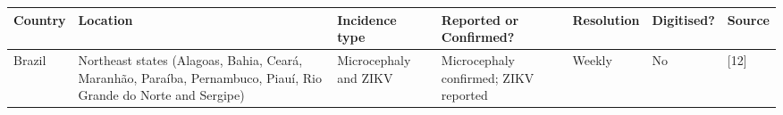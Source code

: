 \documentclass[10pt,letterpaper]{article}
\begin{document}
\begin{longtable}[]{@{}lllllll@{}}
\toprule
\begin{minipage}[b]{0.03\columnwidth}\raggedright\strut
Country\strut
\end{minipage} & \begin{minipage}[b]{0.37\columnwidth}\raggedright\strut
Location\strut
\end{minipage} & \begin{minipage}[b]{0.08\columnwidth}\raggedright\strut
Incidence type\strut
\end{minipage} & \begin{minipage}[b]{0.17\columnwidth}\raggedright\strut
Reported or Confirmed?\strut
\end{minipage} & \begin{minipage}[b]{0.04\columnwidth}\raggedright\strut
Resolution\strut
\end{minipage} & \begin{minipage}[b]{0.04\columnwidth}\raggedright\strut
Digitised?\strut
\end{minipage} & \begin{minipage}[b]{0.08\columnwidth}\raggedright\strut
Source\strut
\end{minipage}\tabularnewline
\midrule
\endhead
\begin{minipage}[t]{0.03\columnwidth}\raggedright\strut
Brazil\strut
\end{minipage} & \begin{minipage}[t]{0.37\columnwidth}\raggedright\strut
Northeast states (Alagoas, Bahia, Ceará, Maranhão, Paraíba, Pernambuco,
Piauí, Rio Grande do Norte and Sergipe)\strut
\end{minipage} & \begin{minipage}[t]{0.08\columnwidth}\raggedright\strut
Microcephaly and ZIKV\strut
\end{minipage} & \begin{minipage}[t]{0.17\columnwidth}\raggedright\strut
Microcephaly confirmed; ZIKV reported\strut
\end{minipage} & \begin{minipage}[t]{0.04\columnwidth}\raggedright\strut
Weekly\strut
\end{minipage} & \begin{minipage}[t]{0.04\columnwidth}\raggedright\strut
No\strut
\end{minipage} & \begin{minipage}[t]{0.08\columnwidth}\raggedright\strut
{[}12{]}\strut
\end{minipage}\tabularnewline

\end{longtable}
\end{document}
